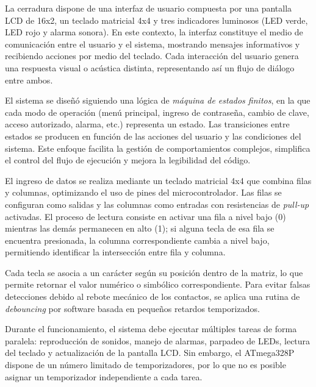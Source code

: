    \vspace{1em}

    La cerradura dispone de una interfaz de usuario compuesta por una pantalla LCD de 16x2, un teclado matricial 4x4 y tres indicadores luminosos (LED verde, LED rojo y alarma sonora). En este contexto, la interfaz constituye el medio de comunicación entre el usuario y el sistema, mostrando mensajes informativos y recibiendo acciones por medio del teclado. Cada interacción del usuario genera una respuesta visual o acústica distinta, representando así un flujo de diálogo entre ambos.

    \vspace{1em}

    El sistema se diseñó siguiendo una lógica de \textit{máquina de estados finitos}, en la que cada modo de operación (menú principal, ingreso de contraseña, cambio de clave, acceso autorizado, alarma, etc.) representa un estado. Las transiciones entre estados se producen en función de las acciones del usuario y las condiciones del sistema. Este enfoque facilita la gestión de comportamientos complejos, simplifica el control del flujo de ejecución y mejora la legibilidad del código.

    \vspace{1em}

    El ingreso de datos se realiza mediante un teclado matricial 4x4 que combina filas y columnas, optimizando el uso de pines del microcontrolador. Las filas se configuran como salidas y las columnas como entradas con resistencias de \textit{pull-up} activadas. El proceso de lectura consiste en activar una fila a nivel bajo (0) mientras las demás permanecen en alto (1); si alguna tecla de esa fila se encuentra presionada, la columna correspondiente cambia a nivel bajo, permitiendo identificar la intersección entre fila y columna.  

    \vspace{1em}

    Cada tecla se asocia a un carácter según su posición dentro de la matriz, lo que permite retornar el valor numérico o simbólico correspondiente. Para evitar falsas detecciones debido al rebote mecánico de los contactos, se aplica una rutina de \textit{debouncing} por software basada en pequeños retardos temporizados.

    \vspace{1em}

    
    Durante el funcionamiento, el sistema debe ejecutar múltiples tareas de forma paralela: reproducción de sonidos, manejo de alarmas, parpadeo de LEDs, lectura del teclado y actualización de la pantalla LCD. Sin embargo, el ATmega328P dispone de un número limitado de temporizadores, por lo que no es posible asignar un temporizador independiente a cada tarea.

